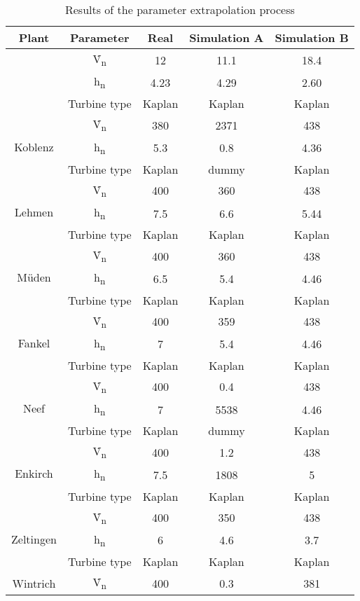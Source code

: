 \begingroup
\renewcommand\arraystretch{0.8}
\begin{longtable}{|c|c|c|c|c|}
 \caption{Results of the parameter extrapolation process}
 \label{tab_res_extra}\\
 \hline
  \textbf{Plant}&\textbf{Parameter}&\textbf{Real}&\textbf{Simulation A}&\textbf{Simulation B}\\
  \hline
  \endhead
  \hline
  \endfoot
  \multirow{3}{*}{HydroRaon}&\.V\textsubscript{n}&12&11.1&18.4\\
  &h\textsubscript{n}&4.23&4.29&2.60\\
  &Turbine type&Kaplan&Kaplan&Kaplan\\
  \hline
  \multirow{3}{*}{Koblenz}&\.V\textsubscript{n}&380&2371&438\\
  &h\textsubscript{n}&5.3&0.8&4.36\\
  &Turbine type&Kaplan&dummy&Kaplan\\
  \hline
  \multirow{3}{*}{Lehmen}&\.V\textsubscript{n}&400&360&438\\
  &h\textsubscript{n}&7.5&6.6&5.44\\
  &Turbine type&Kaplan&Kaplan&Kaplan\\
  \hline
  \multirow{3}{*}{Müden}&\.V\textsubscript{n}&400&360&438\\
  &h\textsubscript{n}&6.5&5.4&4.46\\
  &Turbine type&Kaplan&Kaplan&Kaplan\\
  \hline
  \multirow{3}{*}{Fankel}&\.V\textsubscript{n}&400&359&438\\
  &h\textsubscript{n}&7&5.4&4.46\\
  &Turbine type&Kaplan&Kaplan&Kaplan\\
  \hline
  \multirow{3}{*}{Neef}&\.V\textsubscript{n}&400&0.4&438\\
  &h\textsubscript{n}&7&5538&4.46\\
  &Turbine type&Kaplan&dummy&Kaplan\\
  \hline
  \multirow{3}{*}{Enkirch}&\.V\textsubscript{n}&400&1.2&438\\
  &h\textsubscript{n}&7.5&1808&5\\
  &Turbine type&Kaplan&Kaplan&Kaplan\\
  \hline
  \multirow{3}{*}{Zeltingen}&\.V\textsubscript{n}&400&350&438\\
  &h\textsubscript{n}&6&4.6&3.7\\
  &Turbine type&Kaplan&Kaplan&Kaplan\\
  \hline
  \multirow{3}{*}{Wintrich}&\.V\textsubscript{n}&400&0.3&381\\

\end{longtable}
